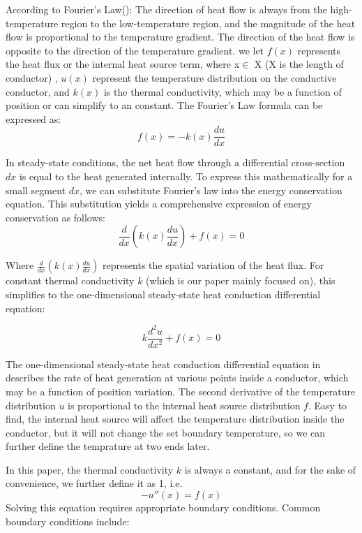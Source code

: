 \documentclass{article}
\begin{document}
    According to Fourier's Law(\textcite{Phisics}): The direction of heat flow is always from the high-temperature region to the low-temperature region, and the magnitude of the heat flow is proportional to the temperature gradient. The direction of the heat flow is opposite to the direction of the temperature gradient. we let \( f(x) \) represents the heat flux or the internal heat source term, where x$\in$ X (X is the length of conductor) , $u(x)$ represent the temperature distribution on the conductive conductor, and  \( k(x) \) is the thermal conductivity, which may be a function of position or can simplify to an constant. The Fourier's Law formula can be expressed as:
      \begin{equation}
          f(x) = -k(x) \frac{du}{dx}
      \end{equation}

    In steady-state conditions, the net heat flow through a differential cross-section $dx$ is equal to the heat generated internally. To express this mathematically for a small segment $dx$, we can substitute Fourier's law into the energy conservation equation. This substitution yields a comprehensive expression of energy conservation as follows:
    \begin{equation}
         \frac{d}{dx} \left( k(x) \frac{du}{dx} \right) + f(x) = 0
    \end{equation}

Where $\frac{d}{dx} \left( k(x) \frac{du}{dx} \right) $ represents the spatial variation of the heat flux. For constant thermal conductivity \( k \) (which is our paper mainly focused on), this simplifies to the one-dimensional steady-state heat conduction differential equation:

\begin{equation}
    k \frac{d^2 u}{dx^2} + f(x) = 0
\end{equation}

The one-dimensional steady-state heat conduction differential equation in \textcite{heat} 
 describes the rate of heat generation at various points inside a conductor, which may be a function of position variation. The second derivative of the temperature distribution \( u \) is proportional to the internal heat source distribution \( f \).  Easy to find, the internal heat source will affect the temperature distribution inside the conductor, but it will not change the set boundary temperature, so we can further define the temprature at two ends later. 


In this paper, the thermal conductivity \( k \) is always a constant, and for the sake of convenience, we further define it as 1, i.e. 
\begin{equation}
    - u''(x) = f(x)
\end{equation}
Solving this equation requires appropriate boundary conditions. Common boundary conditions include:
\end{document}
